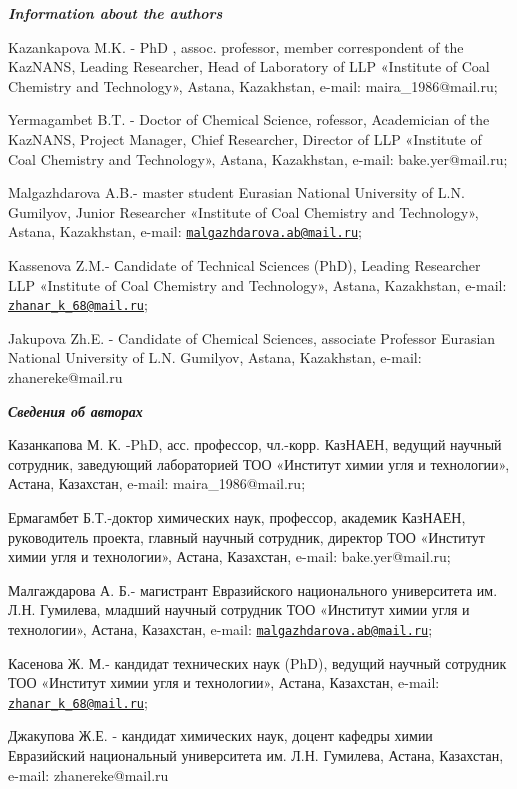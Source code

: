 \begin{authorinfo}
\emph{{\bfseries Information about the authors}}

Kazankapova M.K. - PhD , assoc. professor, member correspondent of the
KazNANS, Leading Researcher, Head of Laboratory of LLP «Institute of
Coal Chemistry and Technology», Astana, Kazakhstan, e-mail:
maira\_1986@mail.ru;

Yermagambet B.T. - Doctor of Chemical Science, rofessor, Academician of
the KazNANS, Project Manager, Chief Researcher, Director of LLP
«Institute of Coal Chemistry and Technology», Astana, Kazakhstan,
e-mail: bake.yer@mail.ru;

Malgazhdarova A.B.- master student Eurasian National University of L.N.
Gumilyov, Junior Researcher «Institute of Coal Chemistry and
Technology», Astana, Kazakhstan, e-mail:
\href{mailto:malgazhdarova.ab@mail.ru}{\nolinkurl{malgazhdarova.ab@mail.ru}};

Kassenova Z.M.- Сandidate of Technical Sciences (PhD), Leading
Researcher LLP «Institute of Coal Chemistry and Technology», Astana,
Kazakhstan, e-mail:
\href{mailto:zhanar_k_68@mail.ru}{\nolinkurl{zhanar\_k\_68@mail.ru}};

Jakupova Zh.E. - Candidate of Chemical Sciences, associate Professor
Eurasian National University of L.N. Gumilyov, Astana, Kazakhstan,
e-mail: zhanereke@mail.ru

\emph{{\bfseries Сведения об авторах}}

Казанкапова М. К. -PhD, асс. профессор, чл.-корр. КазНАЕН, ведущий
научный сотрудник, заведующий лабораторией ТОО «Институт химии угля и
технологии», Астана, Казахстан, e-mail: maira\_1986@mail.ru;

Ермагамбет Б.Т.-доктор химических наук, профессор, академик КазНАЕН,
руководитель проекта, главный научный сотрудник, директор ТОО «Институт
химии угля и технологии», Астана, Казахстан, e-mail: bake.yer@mail.ru;

Малгаждарова А. Б.- магистрант Евразийского национального университета
им. Л.Н. Гумилева, младший научный сотрудник ТОО «Институт химии угля и
технологии», Астана, Казахстан, e-mail:
\href{mailto:malgazhdarova.ab@mail.ru}{\nolinkurl{malgazhdarova.ab@mail.ru}};

Касенова Ж. М.- кандидат технических наук (PhD), ведущий научный
сотрудник ТОО «Институт химии угля и технологии», Астана, Казахстан,
e-mail:
\href{mailto:zhanar_k_68@mail.ru}{\nolinkurl{zhanar\_k\_68@mail.ru}};

Джакупова Ж.Е. - кандидат химических наук, доцент кафедры химии
Евразийский национальный университета им. Л.Н. Гумилева, Астана,
Казахстан, e-mail: zhanereke@mail.ru
\end{authorinfo}
